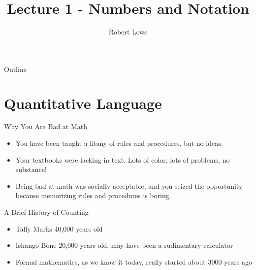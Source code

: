 \documentclass{beamer}
\title{Lecture 1 - Numbers and Notation}
\author{Robert Lowe\\}
\institute[Maryville College] %
{
  Division of Mathematics and Computer Science\\
  Maryville College
}
\date[]{}
\begin{document}
\begin{frame}
  \titlepage
\end{frame}

\begin{frame}{Outline}
  \tableofcontents
\end{frame}


%
%

\section{Quantitative Language}

\begin{frame}{Why You Are Bad at Math}

\begin{itemize}[<+(1)->]
    \item You have been taught a litany of rules and procedures, but no ideas.
    \item Your textbooks were lacking in text.  Lots of color, lots of problems, no substance!
    \item Being bad at math was socially acceptable, and you seized the opportunity because memorizing rules and procedures is boring.
\end{itemize}

\end{frame}


\begin{frame}{A Brief History of Counting}
\begin{itemize}[<+(1)->]
    \item Tally Marks 40,000 years old 
    \item Ishango Bone 20,000 years old, may have been a rudimentary calculator
    \item Formal mathematics, as we know it today, really started about 3000 years ago
\end{itemize}
\end{frame}
\end{document}
